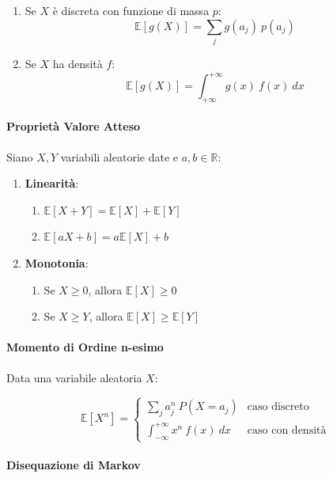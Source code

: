 \documentclass{article}
\begin{document}
\begin{enumerate}
    \item Se $X$ è discreta con funzione di massa $p$:
    \[ \mathbb{E}[g(X)] = \sum_{j} g(a_{j})\:p(a_{j}) \]
    \item Se $X$ ha densità $f$:
    \vspace*{10px}
    \[ \mathbb{E}[g(X)] = \int_{+\infty}^{+\infty} g(x)\:f(x)\:dx \]
\end{enumerate}

\paragraph{Proprietà Valore Atteso} Siano $X,Y$ variabili aleatorie date e $a,b \in \mathbb{R}$:

\begin{enumerate}
    \item \textbf{Linearità}:
    \begin{enumerate}
        \item $\mathbb{E}[X+Y] = \mathbb{E}[X] + \mathbb{E}[Y]$
        \item $\mathbb{E}[aX+b] = a\mathbb{E}[X] + b$
    \end{enumerate}
    \item \textbf{Monotonia}:
    \begin{enumerate}
        \item Se $X \geq 0$, allora $\mathbb{E}[X] \geq 0$
        \item Se $X \geq Y$, allora $\mathbb{E}[X] \geq \mathbb{E}[Y]$
    \end{enumerate}
\end{enumerate}

\paragraph{Momento di Ordine n-esimo} Data una variabile aleatoria $X$:

\[ \mathbb{E}[X^{n}] =  \left\{ \begin{array}{rcl}
        \sum_{j} a^{n}_{j} \: P(X = a_{j}) & \mbox{caso discreto}  \\
        \int_{-\infty}^{+\infty} x^{n}\: f(x) \: dx   & \mbox{caso con densità} 
        \end{array}\right. \]

\paragraph{Disequazione di Markov}
\end{document}
